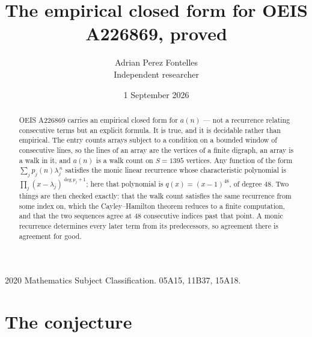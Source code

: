\documentclass[11pt,a4paper]{article}
\title{The empirical closed form for OEIS A226869, proved}
\author{Adrian Perez Fontelles\\ \small Independent researcher}
\date{1 September 2026}
\theoremstyle{plain}
\theoremstyle{definition}
\begin{document}
\maketitle

\begin{abstract}
OEIS A226869 carries an empirical closed form for $a(n)$ --- not a recurrence relating
consecutive terms but an explicit formula. It is true, and it is decidable rather than
empirical. The entry counts arrays subject to a condition on a bounded window of consecutive lines, so the lines of an array are the
vertices of a finite digraph, an array is a walk in it, and $a(n)$ is a walk count on
$S=1395$ vertices. Any function of the form $\sum_j p_j(n)\lambda_j^{\,n}$ satisfies the
monic linear recurrence whose characteristic polynomial is
$\prod_j(x-\lambda_j)^{\deg p_j+1}$; here that polynomial is $q(x)=(x-1)^{48}$, of degree
$48$. Two things are then checked exactly: that the walk count satisfies the same
recurrence from some index on, which the Cayley--Hamilton theorem reduces to a finite
computation, and that the two sequences agree at $48$ consecutive indices past that
point. A monic recurrence determines every later term from its predecessors, so agreement
there is agreement for good.
\end{abstract}

\noindent\small 2020 Mathematics Subject Classification. 05A15, 11B37, 15A18.\normalsize

\section{The conjecture}
\end{document}
